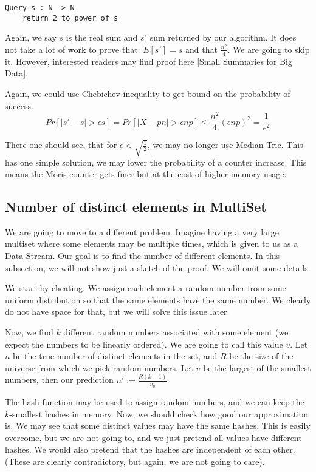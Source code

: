 \begin{lstlisting}
Query s : N -> N
    return 2 to power of s
\end{lstlisting}

Again, we say $s$ is the real sum and $s'$ sum returned by our algorithm. It does not take a lot of work to prove that: $E[s'] = s$ and that $\frac{n^2}{4}$. We are going to skip it. However, interested readers may find proof here [Small Summaries for Big Data].

Again, we could use Chebichev inequality to get bound on the probability of success. 
$$
Pr[|s' - s| > \epsilon s]= Pr[|X-pn| > \epsilon np] \leq \frac{n^2}{4}{(\epsilon np)^2} = \frac{1}{\epsilon^2}
$$

There one should see, that for $\epsilon < \sqrt{\frac{1}{2}}$, we may no longer use Median Tric. This has one simple solution, we may lower the probability of a counter increase. This means the Moris counter gets finer but at the cost of higher memory usage.

\subsection{Number of distinct elements in MultiSet}
We are going to move to a different problem. Imagine having a very large multiset where some elements may be multiple times, which is given to us as a Data Stream. Our goal is to find the number of different elements. In this subsection, we will not show just a sketch of the proof. We will omit some details.

We start by cheating. We assign each element a random number from some uniform distribution so that the same elements have the same number. We clearly do not have space for that, but we will solve this issue later. 

Now, we find $k$ different random numbers associated with some element (we expect the numbers to be linearly ordered). We are going to call this value $v$. Let $n$ be the true number of distinct elements in the set, and $R$ be the size of the universe from which we pick random numbers. Let $v$ be the largest of the smallest numbers, 
then our prediction $n' :=  \frac{R(k-1)}{v_0} $ 

The hash function may be used to assign random numbers, and we can keep the $k$-smallest hashes in memory. Now, we should check how good our approximation is. We may see that some distinct values may have the same hashes. This is easily overcome, but we are not going to, and we just pretend all values have different hashes. We would also pretend that the hashes are independent of each other. (These are clearly contradictory, but again, we are not going to care). 

